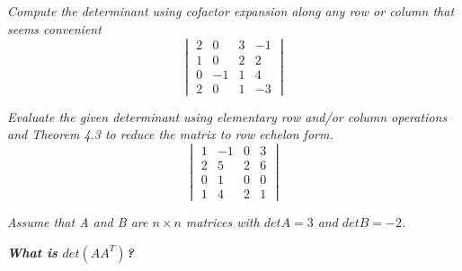 \documentclass[12pt,letterpaper]{hmcpset}
\begin{document}
\section*{}





\begin{problem}[4.2.14]
\textit{Compute the determinant using cofactor expansion along any row or column that seems convenient}
$$
\begin{vmatrix}
2&0&3&-1\\
1&0&2&2\\
0&-1&1&4\\
2&0&1&-3
\end{vmatrix}
$$
\end{problem}

\begin{solution}
\end{solution}

\newpage



\begin{problem}[4.2.24]
\textit{Evaluate the given determinant using elementary row and/or column operations and Theorem 4.3 to reduce the matrix to row echelon form. }
$$
\begin{vmatrix}
1&-1&0&3\\
2&5&2&6\\
0&1&0&0\\
1&4&2&1
\end{vmatrix}
$$
\end{problem}
\begin{solution}
\end{solution}

\newpage



\begin{problem}[4.2.52]
\textit{Assume that A and B are $ n\times n$ matrices with $det A =3 $ and $det B = -2$.}
\begin{center}
\textbf{\textit{What is $det(AA^T)$?}}
\end{center}
\end{problem}
\end{document}
